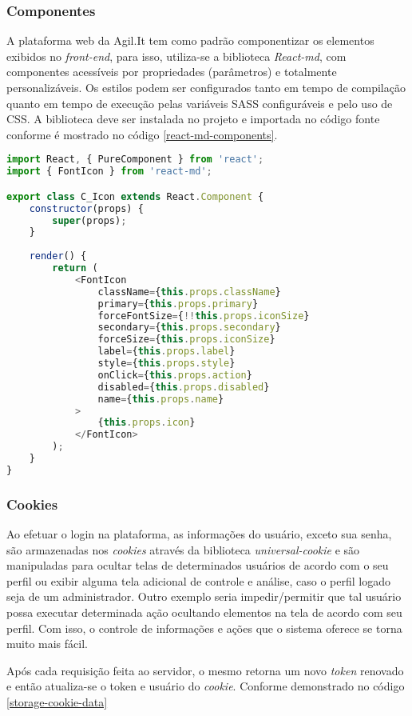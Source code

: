 \subsubsection{Componentes}
A plataforma web da Agil.It tem como padrão componentizar os elementos exibidos no \textit{front-end}, para isso, utiliza-se a biblioteca \textit{React-md}, com componentes acessíveis por propriedades (parâmetros) e totalmente personalizáveis. Os estilos podem ser configurados tanto em tempo de compilação quanto em tempo de execução pelas variáveis SASS configuráveis e pelo uso de CSS.
A biblioteca deve ser instalada no projeto e importada no código fonte conforme é mostrado no código \ref{react-md-components}.

\begin{lstlisting}[language=JavaScript, caption={Importando o componente de Ícone do react-md}, label={react-md-components}]
import React, { PureComponent } from 'react';
import { FontIcon } from 'react-md';

export class C_Icon extends React.Component {
	constructor(props) {
		super(props);
	}
	
	render() {
		return (
			<FontIcon 
				className={this.props.className}
				primary={this.props.primary}
				forceFontSize={!!this.props.iconSize}
				secondary={this.props.secondary}
				forceSize={this.props.iconSize}
				label={this.props.label}
				style={this.props.style}
				onClick={this.props.action}
				disabled={this.props.disabled}
				name={this.props.name}
			>
				{this.props.icon}
			</FontIcon>
		);
	}
}
\end{lstlisting}

\subsubsection{Cookies}
Ao efetuar o login na plataforma, as informações do usuário, exceto sua senha, são armazenadas nos \textit{cookies} através da biblioteca \textit{universal-cookie} e são manipuladas para ocultar telas de determinados usuários de acordo com o seu perfil ou exibir alguma tela adicional de controle e análise, caso o perfil logado seja de um administrador. Outro exemplo seria impedir/permitir que tal usuário possa executar determinada ação ocultando elementos na tela de acordo com seu perfil.
Com isso, o controle de informações e ações que o sistema oferece se torna muito mais fácil.

Após cada requisição feita ao servidor, o mesmo retorna um novo \textit{token} renovado e então atualiza-se o token e usuário do \textit{cookie}.
Conforme demonstrado no código \ref{storage-cookie-data}

